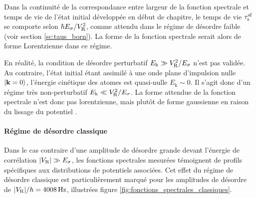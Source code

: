 Dans la continuité de la correspondance entre largeur de la fonction spectrale et temps de vie de l'état initial développée en début de chapitre, le temps de vie $\tau_{\mathrm{s}}^{\mathrm{sf}}$ se comporte selon $\hslash E_{\sigma}/V_{\mathrm{R}}^2$, comme attendu dans le régime de désordre faible (voir section \ref{sc:taus_born}). La forme de la fonction spectrale serait alors de forme Lorentzienne dans ce régime\citep{kuhn2007coherent}.

En réalité, la condition de désordre perturbatif $E_{\mathrm{k}}\gg V_{\mathrm{R}}^2/E_{\sigma}$ n'est pas validée. Au contraire, l'état initial étant assimilé à une onde plane d'impulsion nulle $\left| \mathbf{k}=0 \right\rangle$, l'énergie cinétique des atomes est quasi-nulle $E_{\mathrm{k}}\sim 0$. Il s'agit donc d'un régime très non-perturbatif $E_{\mathrm{k}}\ll V_{\mathrm{R}}^2/E_{\sigma}$. La forme attendue de la fonction spectrale n'est donc pas lorentzienne, mais plutôt de forme gaussienne en raison du lissage du potentiel \citep{denechaud2018vers}. 



\paragraph*{Régime de désordre classique}

Dans le cas contraire d'une amplitude de désordre grande devant l'énergie de corrélation $|V_{\mathrm{R}}|\gg E_{\sigma}$, les fonctions spectrales mesurées témoignent de profils spécifiques aux distributions de potentiels associées. Cet effet du régime de désordre classique est particulièrement marqué pour les amplitudes de désordre de $|V_{\mathrm{R}}|/h=\SI{4008}{\hertz}$, illustrées figure \ref{fig:fonctions_spectrales_classiques}.

